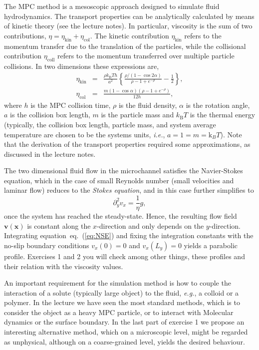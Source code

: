 \documentclass[sizes,12pt,nftimes]{article}
\begin{document}
The MPC method is a mesoscopic approach designed to simulate fluid
hydrodynamics. The transport properties can be analytically calculated
by means of kinetic theory (see the lecture notes). In particular,
viscosity is the sum of two contributions, $\eta = \eta_\mathrm{kin} +
\eta_\mathrm{col}$. The kinetic contribution $\eta_\mathrm{kin}$
refers to the momentum transfer due to the translation of the
particles, while the collisional contribution $\eta_\mathrm{coll}$
refers to the momentum transferred over multiple particle collisions. 
In two dimensions these expressions are,
\begin{eqnarray}
    \eta_\mathrm{kin} &=& \frac{\rho k_\mathrm{B}T h}{a^2} \left\{ 
       \frac{\rho/\left( 1 - \cos 2\alpha \right)}{\rho - 1 + e^{-\rho}} - \frac{1}{2} \right\}, 
        \nonumber \\ \label{eq:eta}
    \eta_\mathrm{col} &=& \frac{m \left( 1 - \cos \alpha \right) \left( \rho - 1 + e^{-\rho} \right)}{12 h},
\end{eqnarray}
where $h$ is the MPC collision time, $\rho$ is the fluid density,
$\alpha$ is the rotation angle, $a$ is the collision box length, $m$
is the particle mass and $k_\mathrm{B}T$ is the thermal energy
(typically, the collision box length, particle mass, and system
average temperature are chosen to be the systems units, \emph{i.e.},
$a = 1 = m = {\mathrm k}_B T$). Note that the derivation of the
transport properties required some approximations, as discussed in the
lecture notes.
  
The two dimensional fluid flow in the microchannel satisfies the
Navier-Stokes equation, which in the case of small Reynolds number
(small velocities and laminar flow) reduces to the {\em Stokes
equation}, and in this case further simplifies to
  \begin{equation}
    \label{eq:NSE}
    \partial_y^2 v_x = \frac{1}{\eta} g,
  \end{equation}
once the system has reached the steady-state. Hence, the resulting
  flow field $\bm{v}(\bm{x})$ is constant along the $x$-direction and
  only depends on the $y$-direction. Integrating
  equation~eq.~(\ref{eq:NSE}) and fixing the integration constants
  with the no-slip boundary conditions $v_x(0)=0$ and $v_x(L_y)=0$
  yields a parabolic profile. Exercises 1 and 2 you will check  among other things, these 
profiles and their relation with the viscosity values. 
  
\vspace*{0.2cm} An important requirement for the simulation method is
how to couple the interaction of a solute (typically large object) to
the fluid, \emph{e.g.}, a colloid or a polymer.  In the lecture we
have seen the most standard methods, which is to consider the object
as a heavy MPC particle, or to interact with Molecular dynamics or the
surface boundary. In the last part of exercise 1 we propose an interesting
alternative method, which on a microscopic level, might be regarded as
unphysical, although on a coarse-grained level, yields the desired
behaviour.
  
\end{document}
